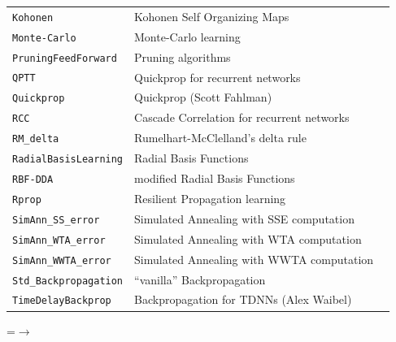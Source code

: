 {\newpage
\clearpage
\samepage \begin{tabular}{|l|l|}
\hline 
{\tt Kohonen}           & Kohonen Self Organizing Maps\\ 
{\tt Monte-Carlo}       & Monte-Carlo learning\\ 
{\tt PruningFeedForward}& Pruning algorithms \\ 
{\tt QPTT}              & Quickprop for recurrent networks\\ 
{\tt Quickprop}         & Quickprop (Scott Fahlman)\\ 
{\tt RCC}               & Cascade Correlation for recurrent networks~~~~~~\\ 
{\tt RM\_delta}         & Rumelhart-McClelland's delta rule\\ 
{\tt RadialBasisLearning} & Radial Basis Functions\\ 
{\tt RBF-DDA}             & modified Radial Basis Functions\\ 
{\tt Rprop}               & Resilient Propagation learning\\ 
{\tt SimAnn\_SS\_error}   & Simulated Annealing with SSE computation\\ 
{\tt SimAnn\_WTA\_error}  & Simulated Annealing with WTA computation\\ 
{\tt SimAnn\_WWTA\_error} & Simulated Annealing with WWTA computation\\ 
{\tt Std\_Backpropagation}& ``vanilla'' Backpropagation\\ 
{\tt TimeDelayBackprop}   & Backpropagation for TDNNs (Alex Waibel)\\ 
\hline 
\end{tabular}
}

{\newpage
\clearpage
\samepage {}
}

{\newpage
\clearpage
\samepage {}
}

{\newpage
\clearpage
\samepage \begin{figure}[htbp]
\begin{center}
  \begin{minipage}{\textwidth}
  \end{minipage}

\label{FigUnitInfoPanel}
\end{center}
\end{figure}
}

{\newpage
\clearpage
\samepage \setbox\sizebox=\hbox{$\rightarrow$}\box\sizebox
}

